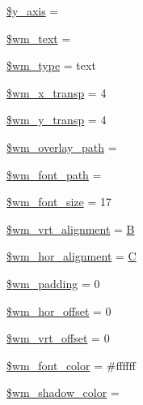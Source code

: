\begin{DoxyCompactItemize}
\item 
\hyperlink{class_c_i___image__lib_ac60512307da37068c0821f7dc2488608}{\$y\+\_\+axis} = \textquotesingle{}\textquotesingle{}
\item 
\hyperlink{class_c_i___image__lib_a412eac22e8d585a33f28f132f13d482b}{\$wm\+\_\+text} = \textquotesingle{}\textquotesingle{}
\item 
\hyperlink{class_c_i___image__lib_a530808b613890909a92bf6096401e9be}{\$wm\+\_\+type} = \textquotesingle{}text\textquotesingle{}
\item 
\hyperlink{class_c_i___image__lib_a720496900551e5c29b11a732fb4f35ab}{\$wm\+\_\+x\+\_\+transp} = 4
\item 
\hyperlink{class_c_i___image__lib_aa9ab81b196739723a7c38d9431c9fa11}{\$wm\+\_\+y\+\_\+transp} = 4
\item 
\hyperlink{class_c_i___image__lib_a82ec5b8a6822dc7f9c70f4b5aafdebd4}{\$wm\+\_\+overlay\+\_\+path} = \textquotesingle{}\textquotesingle{}
\item 
\hyperlink{class_c_i___image__lib_a6870985f3e6bbf1a29e5875c054598f4}{\$wm\+\_\+font\+\_\+path} = \textquotesingle{}\textquotesingle{}
\item 
\hyperlink{class_c_i___image__lib_a0ea2a2f73623aa0631670017a4e68419}{\$wm\+\_\+font\+\_\+size} = 17
\item 
\hyperlink{class_c_i___image__lib_a1c52f46917a30e084db07a8c8e13af86}{\$wm\+\_\+vrt\+\_\+alignment} = \textquotesingle{}\hyperlink{_chart_8min_8js_a26d3f33c75df2b722ed17ab198b5fbea}{B}\textquotesingle{}
\item 
\hyperlink{class_c_i___image__lib_a74d790b77baa0c22cd0b812abc41765c}{\$wm\+\_\+hor\+\_\+alignment} = \textquotesingle{}\hyperlink{_chart_8min_8js_ae59e0ac8d0c43c81f50236f719763efc}{C}\textquotesingle{}
\item 
\hyperlink{class_c_i___image__lib_ab1f63f5ae604d060dbc39653f6440826}{\$wm\+\_\+padding} = 0
\item 
\hyperlink{class_c_i___image__lib_aed778e3e9ecb74e8c61d8c4894581f7f}{\$wm\+\_\+hor\+\_\+offset} = 0
\item 
\hyperlink{class_c_i___image__lib_a577602650e0c67f9f4bfcdeda075fa50}{\$wm\+\_\+vrt\+\_\+offset} = 0
\item 
\hyperlink{class_c_i___image__lib_ae9498442637ff2466d4426af45f68c6b}{\$wm\+\_\+font\+\_\+color} = \textquotesingle{}\#ffffff\textquotesingle{}
\item 
\hyperlink{class_c_i___image__lib_aca292b49514fe3238440675c4b2642ca}{\$wm\+\_\+shadow\+\_\+color} = \textquotesingle{}\textquotesingle{}

\end{DoxyCompactItemize}
